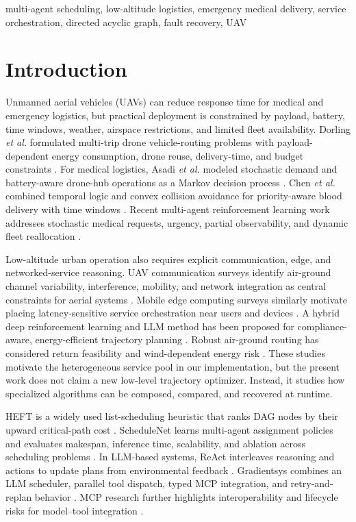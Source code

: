 \documentclass[conference]{IEEEtran}
\begin{document}
\begin{IEEEkeywords}
multi-agent scheduling, low-altitude logistics, emergency medical delivery,
service orchestration, directed acyclic graph, fault recovery, UAV
\end{IEEEkeywords}

\section{Introduction}

Unmanned aerial vehicles (UAVs) can reduce response time for medical and
emergency logistics, but practical deployment is constrained by payload,
battery, time windows, weather, airspace restrictions, and limited fleet
availability. Dorling \textit{et al.} formulated multi-trip
drone vehicle-routing problems
with payload-dependent energy consumption, drone reuse, delivery-time, and
budget constraints \cite{dorling2017vrp}. For medical logistics, Asadi
\textit{et al.} modeled stochastic demand and battery-aware drone-hub
operations as a Markov decision process \cite{asadi2021mdp}. Chen
\textit{et al.} combined temporal logic and convex collision avoidance for
priority-aware blood delivery with time windows \cite{chen2025medical}.
Recent multi-agent reinforcement learning work addresses stochastic medical
requests, urgency, partial observability, and dynamic fleet reallocation
\cite{guven2026uavmarl}.

Low-altitude urban operation also requires explicit communication, edge, and
networked-service reasoning. UAV communication surveys identify air-ground
channel variability, interference, mobility, and network integration as
central constraints for aerial systems \cite{zeng2016uavcomm,mozaffari2019uav}.
Mobile edge computing surveys similarly motivate placing latency-sensitive
service orchestration near users and devices \cite{mao2017mec,mach2017mec}.
A hybrid deep reinforcement learning and LLM method has been proposed for
compliance-aware, energy-efficient trajectory planning \cite{gong2025drl}.
Robust air-ground routing has considered return feasibility and
wind-dependent energy risk \cite{li2026robust}. These studies motivate the
heterogeneous service pool in our implementation, but the present work does
not claim a new low-level trajectory optimizer. Instead, it studies how
specialized algorithms can be composed, compared, and recovered at runtime.

HEFT is a widely used list-scheduling heuristic that ranks DAG nodes by their
upward critical-path cost \cite{topcuoglu2002heft}. ScheduleNet learns
multi-agent assignment policies and evaluates makespan, inference time,
scalability, and ablation across scheduling problems
\cite{park2021schedulenet}. In LLM-based systems, ReAct interleaves reasoning
and actions to update plans from environmental feedback
\cite{yao2023react}. Gradientsys combines an LLM scheduler, parallel tool
dispatch, typed MCP integration, and retry-and-replan behavior
\cite{song2025gradientsys}. MCP research further highlights interoperability
and lifecycle risks for model--tool integration \cite{hou2025mcp}.
\end{document}
